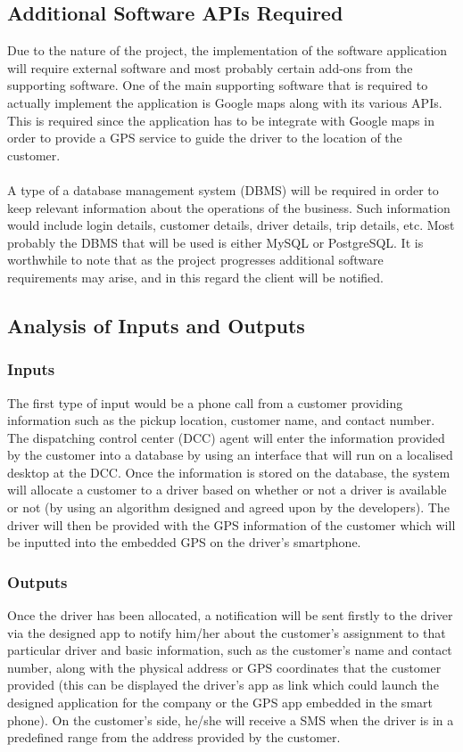 \documentclass[a4paper,12pt]{article}
\begin{document}
\subsection{Additional Software APIs Required}
Due to the nature of the project, the implementation of the software application will require external software and most probably certain add-ons from the supporting software. One of the main supporting software that is required to actually implement the application is Google maps along with its various APIs. This is required since the application has to be integrate with Google maps in order to provide a GPS service to guide the driver to the location of the customer. \\\\
A type of a database management system (DBMS) will be required in order to keep relevant information about the operations of the business. Such information would include login details, customer details, driver details, trip details, etc. Most probably the DBMS that will be used is either MySQL or PostgreSQL. It is worthwhile to note that as the project progresses additional software requirements may arise, and in this regard the client will be notified.

\subsection{Analysis of Inputs and Outputs}
\subsubsection{Inputs}
The first type of input would be a phone call from a customer providing information such as the pickup location, customer name, and contact number. The dispatching control center (DCC) agent will enter the information provided by the customer into a database by using an interface that will run on a localised desktop at the DCC. Once the information is stored on the database, the system will allocate a customer to a driver based on whether or not a driver is available or not (by using an algorithm designed and agreed upon by the developers). The driver will then be provided with the GPS information of the customer which will be inputted into the embedded GPS on the driver's smartphone.

\subsubsection{Outputs}
Once the driver has been allocated, a notification will be sent firstly to the driver via the designed app to notify him/her about the customer's assignment to that particular driver and basic information, such as the customer's name and contact number, along with the physical address or GPS coordinates that the customer provided (this can be displayed the driver's app as link which could launch the designed application for the company or the GPS app embedded in the smart phone). On the customer's side, he/she will receive a SMS when the driver is in a predefined range from the address provided by the customer.
\end{document}
